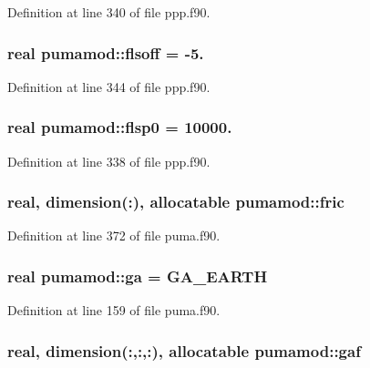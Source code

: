 \-Definition at line 340 of file ppp.\-f90.

\hypertarget{classpumamod_a2a580be12b22eb35c66b88168ad41a5a}{
\subsubsection[{flsoff}]{\setlength{\rightskip}{0pt plus 5cm}real {\bf pumamod\-::flsoff} = -\/5.}}
\label{classpumamod_a2a580be12b22eb35c66b88168ad41a5a}


\-Definition at line 344 of file ppp.\-f90.

\hypertarget{classpumamod_a13482db37c1abe130d4dc4af706bbfcd}{
\subsubsection[{flsp0}]{\setlength{\rightskip}{0pt plus 5cm}real {\bf pumamod\-::flsp0} = 10000.}}
\label{classpumamod_a13482db37c1abe130d4dc4af706bbfcd}


\-Definition at line 338 of file ppp.\-f90.

\hypertarget{classpumamod_a859085f4ee94ade9cc560157a833370e}{
\subsubsection[{fric}]{\setlength{\rightskip}{0pt plus 5cm}real, dimension(\-:), allocatable {\bf pumamod\-::fric}}}
\label{classpumamod_a859085f4ee94ade9cc560157a833370e}


\-Definition at line 372 of file puma.\-f90.

\hypertarget{classpumamod_afab1546c76a48d45df0296c921674b29}{
\subsubsection[{ga}]{\setlength{\rightskip}{0pt plus 5cm}real {\bf pumamod\-::ga} = \-G\-A\-\_\-\-E\-A\-R\-T\-H}}
\label{classpumamod_afab1546c76a48d45df0296c921674b29}


\-Definition at line 159 of file puma.\-f90.

\hypertarget{classpumamod_a7b5ac8c859782a4cc38346f7b9a61dcd}{
\subsubsection[{gaf}]{\setlength{\rightskip}{0pt plus 5cm}real, dimension(\-:,\-:,\-:), allocatable {\bf pumamod\-::gaf}}}
\label{classpumamod_a7b5ac8c859782a4cc38346f7b9a61dcd}


